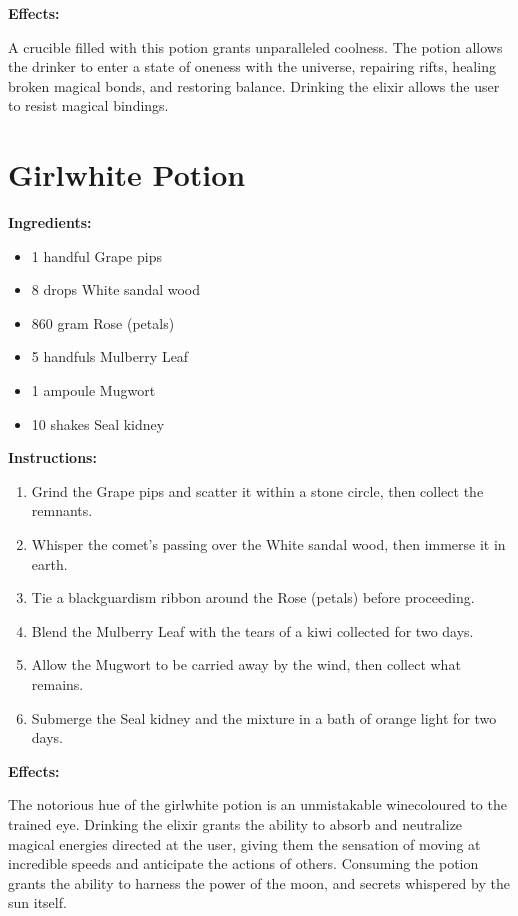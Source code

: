 \documentclass{article}
\begin{document}
\textbf{Effects:}

A crucible filled with this potion grants unparalleled coolness. The potion allows the drinker to enter a state of oneness with the universe, repairing rifts, healing broken magical bonds, and restoring balance. Drinking the elixir allows the user to resist magical bindings.

\newpage
\section*{Girlwhite Potion}

\textbf{Ingredients:}

\begin{itemize}
  \item 1 handful Grape pips
  \item 8 drops White sandal wood
  \item 860 gram Rose (petals)
  \item 5 handfuls Mulberry Leaf
  \item 1 ampoule Mugwort
  \item 10 shakes Seal kidney
\end{itemize}

\textbf{Instructions:}

\begin{enumerate}
  \item Grind the Grape pips and scatter it within a stone circle, then collect the remnants.
  \item Whisper the comet’s passing over the White sandal wood, then immerse it in earth.
  \item Tie a blackguardism ribbon around the Rose (petals) before proceeding.
  \item Blend the Mulberry Leaf with the tears of a kiwi collected for two days.
  \item Allow the Mugwort to be carried away by the wind, then collect what remains.
  \item Submerge the Seal kidney and the mixture in a bath of orange light for two days.
\end{enumerate}

\textbf{Effects:}

The notorious hue of the girlwhite potion is an unmistakable winecoloured to the trained eye. Drinking the elixir grants the ability to absorb and neutralize magical energies directed at the user, giving them the sensation of moving at incredible speeds and anticipate the actions of others. Consuming the potion grants the ability to harness the power of the moon, and secrets whispered by the sun itself.
\end{document}
